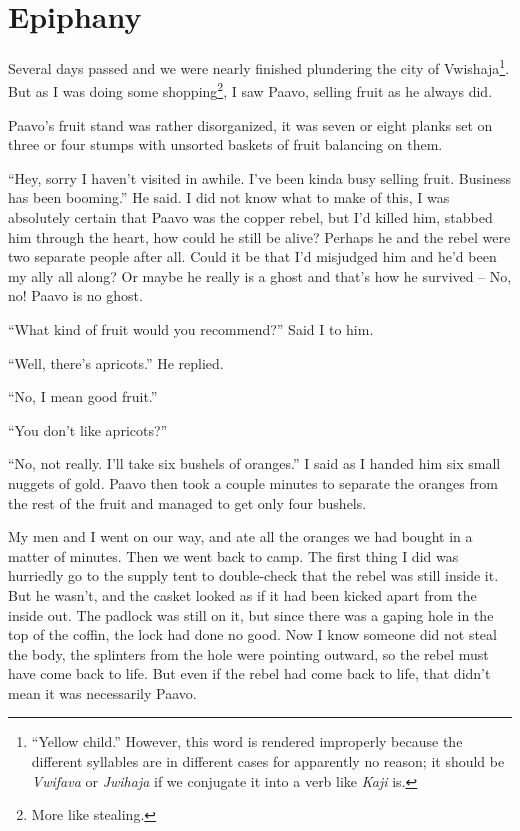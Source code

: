 \chapter{Epiphany}

Several days passed and we were nearly finished plundering the city of Vwishaja\footnote{``Yellow child.'' However, this word is rendered improperly because the different syllables are in different cases for apparently no reason; it should be \emph{Vwifava} or \emph{Jwihaja} if we conjugate it into a verb like \emph{Ka\-ji} is.}. But as I was doing some shopping\footnote{More like stealing.}, I saw Paa\-vo, selling fruit as he always did.

Paa\-vo's fruit stand was rather disorganized, it was seven or eight planks set on three or four stumps with unsorted baskets of fruit balancing on them.

``Hey, sorry I haven't visited in awhile. I've been kinda busy selling fruit. Business has been booming.'' He said. I did not know what to make of this, I was absolutely certain that Paa\-vo was the copper rebel, but I'd killed him, stabbed him through the heart, how could he still be alive?
Perhaps he and the rebel were two separate people after all.
Could it be that I'd misjudged him and he'd been my ally all along?
Or maybe he really is a ghost and that's how he survived -- No, no! Paa\-vo is no ghost.

``What kind of fruit would you recommend?'' Said I to him.

``Well, there's apricots.'' He replied.

``No, I mean good fruit.''

``You don't like apricots?''

``No, not really. I'll take six bushels of oranges.'' I said as I handed him six small nuggets of gold. Paa\-vo then took a couple minutes to separate the oranges from the rest of the fruit and managed to get only four bushels.

My men and I went on our way, and ate all the oranges we had bought in a matter of minutes. Then we went back to camp. The first thing I did was hurriedly go to the supply tent to double-check that the rebel was still inside it. But he wasn't, and the casket looked as if it had been kicked apart from the inside out. The padlock was still on it, but since there was a gaping hole in the top of the coffin, the lock had done no good. Now I know someone did not steal the body, the splinters from the hole were pointing outward, so the rebel must have come back to life. But even if the rebel had come back to life, that didn't mean it was necessarily Paa\-vo.

